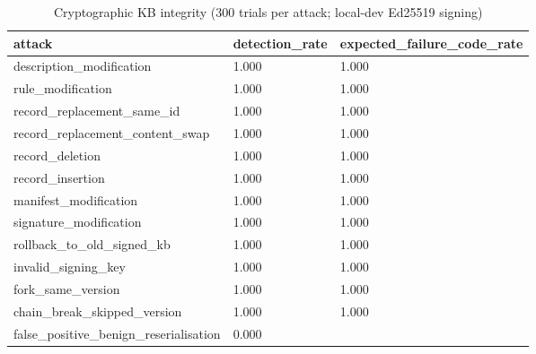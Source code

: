 \begin{table}[t]\centering\caption{Cryptographic KB integrity (300 trials per attack; local-dev Ed25519 signing)}
\begin{tabular}{lll}\hline
attack & detection\_rate & expected\_failure\_code\_rate \\\hline
description\_modification & 1.000 & 1.000 \\
rule\_modification & 1.000 & 1.000 \\
record\_replacement\_same\_id & 1.000 & 1.000 \\
record\_replacement\_content\_swap & 1.000 & 1.000 \\
record\_deletion & 1.000 & 1.000 \\
record\_insertion & 1.000 & 1.000 \\
manifest\_modification & 1.000 & 1.000 \\
signature\_modification & 1.000 & 1.000 \\
rollback\_to\_old\_signed\_kb & 1.000 & 1.000 \\
invalid\_signing\_key & 1.000 & 1.000 \\
fork\_same\_version & 1.000 & 1.000 \\
chain\_break\_skipped\_version & 1.000 & 1.000 \\
false\_positive\_benign\_reserialisation & 0.000 &  \\
\hline\end{tabular}\end{table}
